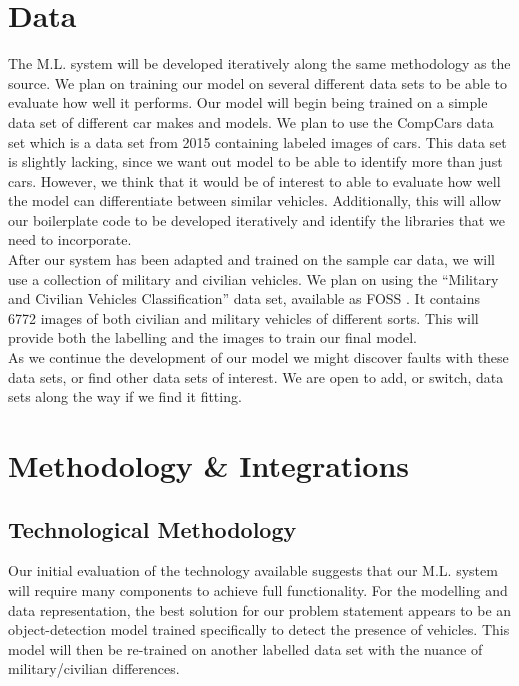 \documentclass[12pt,twoside]{article}
\begin{document}
\section{Data}
The M.L. system will be developed iteratively along the same methodology as the source. We plan on training our model on several different data sets to be able to evaluate how well it performs. Our model will begin being trained on a simple data set of different car makes and models. We plan to use the CompCars data set which is a data set from 2015 containing labeled images of cars.\cite{compCars} This data set is slightly lacking, since we want out model to be able to identify more than just cars. However, we think that it would be of interest to able to evaluate how well the model can differentiate between similar vehicles. Additionally, this will allow our boilerplate code to be developed iteratively and identify the libraries that we need to incorporate. \\

After our system has been adapted and trained on the sample car data, we will use a collection of military and civilian vehicles. We plan on using the ``Military and Civilian Vehicles Classification'' data set, available as FOSS \cite{militaryData}. It contains 6772 images of both civilian and military vehicles of different sorts. This will provide both the labelling and the images to train our final model. \\

As we continue the development of our model we might discover faults with these data sets, or find other data sets of interest. We are open to add, or switch, data sets along the way if we find it fitting.

\section{Methodology \& Integrations}
\subsection{Technological Methodology}
Our initial evaluation of the technology available suggests that our M.L. system will require many components to achieve full functionality. For the modelling and data representation, the best solution for our problem statement appears to be an object-detection model trained specifically to detect the presence of vehicles. This model will then be re-trained on another labelled data set with the nuance of military/civilian differences.\\
\end{document}
